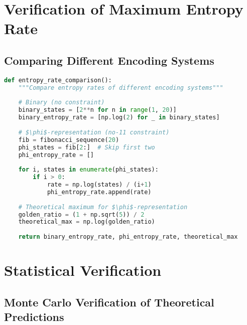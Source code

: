 \section{Verification of Maximum Entropy Rate}

\subsection{Comparing Different Encoding Systems}

\begin{lstlisting}[language=Python, caption=Entropy Rate Comparison]
def entropy_rate_comparison():
    """Compare entropy rates of different encoding systems"""
    
    # Binary (no constraint)
    binary_states = [2**n for n in range(1, 20)]
    binary_entropy_rate = [np.log(2) for _ in binary_states]
    
    # $\phi$-representation (no-11 constraint)
    fib = fibonacci_sequence(20)
    phi_states = fib[2:]  # Skip first two
    phi_entropy_rate = []
    
    for i, states in enumerate(phi_states):
        if i > 0:
            rate = np.log(states) / (i+1)
            phi_entropy_rate.append(rate)
    
    # Theoretical maximum for $\phi$-representation
    golden_ratio = (1 + np.sqrt(5)) / 2
    theoretical_max = np.log(golden_ratio)
    
    return binary_entropy_rate, phi_entropy_rate, theoretical_max
\end{lstlisting}

\section{Statistical Verification}

\subsection{Monte Carlo Verification of Theoretical Predictions}

